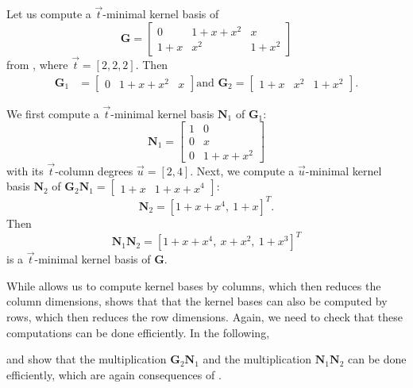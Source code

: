\begin{example}
Let us compute a $\vec{t}$-minimal kernel basis of 
\[
\mathbf{G}=\left[\begin{array}{ccc}
0 & 1+x+x^{2} & x\\
1+x & x^{2} & 1+x^{2}
\end{array}\right]
\]
 from , where $\vec{t}=\left[2,2,2\right]$.
Then 
\begin{align*}
\mathbf{G}_{1} & =\left[\begin{array}{ccc}
0 & 1+x+x^{2} & x\end{array}\right]\mbox{and }\mathbf{G}_{2}=\left[\begin{array}{ccc}
1+x & x^{2} & 1+x^{2}\end{array}\right].
\end{align*}


We first compute a $\vec{t}$-minimal kernel basis $\mathbf{N}_{1}$
of $\mathbf{G}_{1}$: 
\[
\mathbf{N}_{1}=\left[\begin{array}{cc}
1 & 0\\
0 & x\\
0 & 1+x+x^{2}
\end{array}\right]
\]
 with its $\vec{t}$-column degrees $\vec{u}=\left[2,4\right]$. Next,
we compute a $\vec{u}$-minimal kernel basis $\mathbf{N}_{2}$ of
$\mathbf{G}_{2}\mathbf{N}_{1}=\left[\begin{array}{cc}
1+x & 1+x+x^{4}\end{array}\right]$: 
\[
\mathbf{N}_{2}=[1+x+x^{4},\ 1+x]^{T}.
\]
 Then 
\[
\mathbf{N}_{1}\mathbf{N}_{2}=[1+x+x^{4},\ x+x^{2},\ 1+x^{3}]^{T}
\]
 is a $\vec{t}$-minimal kernel basis of $\mathbf{G}$. 
\end{example}
While  allows
us to compute kernel bases by columns, which then reduces the column
dimensions, 
shows that that the kernel bases can also be computed by rows, which
then reduces the row dimensions. Again, we need to check that these
computations can be done efficiently. In the following, %
\begin{comment}
\prettyref{lem:sizeOfG2N1} shows that the size of $\mathbf{G}_{2}\mathbf{N}_{1}$
is within a required bound. Then 
\end{comment}
{}  and 
show that the multiplication $\mathbf{G}_{2}\mathbf{N}_{1}$ and the
multiplication $\mathbf{N}_{1}\mathbf{N}_{2}$ can be done efficiently,
which are again consequences of .%
\begin{comment}
\begin{lem}
\label{lem:sizeOfG2N1}The sum of the column degrees of $\mathbf{G}_{2}\mathbf{N}_{1}$
is bounded by $\xi$.\end{lem}
\begin{proof}
This follows from \prettyref{thm:boundOfSumOfShiftedDegreesOfKernelBasis}
and \prettyref{lem:boundOnDegreesOfFA}.\end{proof}
\end{comment}

